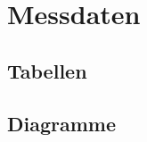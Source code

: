 \startcontents
\chapter{Messdaten}




\stopcontents
\section{Tabellen}










\section{Diagramme}










\startcontents
\stopcontents